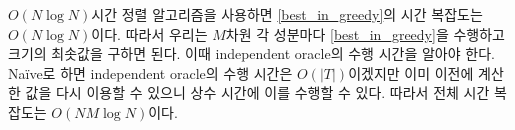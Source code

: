 \documentclass{article}
\begin{document}
	$O(N\log{N})$시간 정렬 알고리즘을 사용하면 \ref{best_in_greedy}의 시간 복잡도는 $O(N\log{N})$이다.
	따라서 우리는 $M$차원 각 성분마다 \ref{best_in_greedy}을 수행하고 크기의 최솟값을 구하면 된다.
	이때 independent oracle의 수행 시간을 알아야 한다. 
	Naïve로 하면 independent oracle의 수행 시간은 $O(|T|)$이겠지만 이미 이전에 계산한 값을 다시 이용할 수 있으니 상수 시간에 이를 수행할 수 있다.
	따라서 전체 시간 복잡도는 $O(NM\log{N})$이다.
	
    
\end{document}
